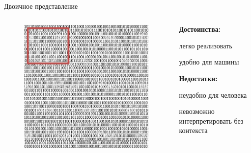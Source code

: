 \begin{frame}{\\Двоичное представление}
	\topline
	\justifying
	\begin{columns}[T,onlytextwidth]
	\begin{column}{0.6\textwidth}
		\vspace{10mm}
		\begin{figure}[H]
			\includegraphics[scale=0.5]{./figures/sd_sc_code/binary.jpg}
		\end{figure}		
	\end{column}

	\begin{column}{0.4\textwidth}
	\vspace{10mm}
	\textbf{Достоинства:}
	\begin{textitemize}		
		\item легко реализовать
		\item удобно для машины
	\end{textitemize}		

	\bigskip
	\textbf{Недостатки:}
		
	\begin{textitemize}		
		\item неудобно для человека
		\item невозможно интерпретировать без контекста
	\end{textitemize}	

	\end{column}
\end{columns}
\end{frame}

